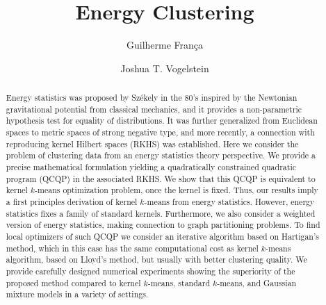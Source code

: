 \documentclass[aps,preprint,nofootinbib,floatfix]{revtex4-1}
\begin{document}
\title{Energy Clustering}

\author{Guilherme Fran\c ca}
\author{Joshua T. Vogelstein}


\begin{abstract}
Energy statistics was proposed by Sz\' ekely in the 80's inspired by the 
Newtonian gravitational potential from classical mechanics, and it provides 
a non-parametric hypothesis test for equality of distributions. 
It was further generalized from Euclidean spaces to metric spaces of 
strong negative type, and more recently, a connection with reproducing 
kernel Hilbert spaces (RKHS) was established. 
Here we consider the problem of clustering data from an 
energy statistics theory perspective.
We provide a precise mathematical formulation 
yielding a quadratically constrained 
quadratic program (QCQP) in the associated RKHS. We show that this QCQP
is equivalent to kernel $k$-means optimization problem, once the kernel
is fixed.
Thus, our results imply a first principles derivation of kernel $k$-means 
from energy statistics.
However, energy statistics fixes a family of standard kernels.
Furthermore, we also consider a weighted version of energy statistics, 
making connection to graph partitioning problems.
To find local optimizers of such QCQP we consider an iterative algorithm based 
on Hartigan's method, which in this case has the same computational cost 
as kernel $k$-means algorithm, based on Lloyd's method, but usually 
with better clustering quality. 
We provide carefully designed numerical experiments showing the superiority 
of the proposed method compared to kernel $k$-means, standard $k$-means, 
and Gaussian mixture models in a variety of settings.
\end{abstract}


\maketitle
\end{document}

